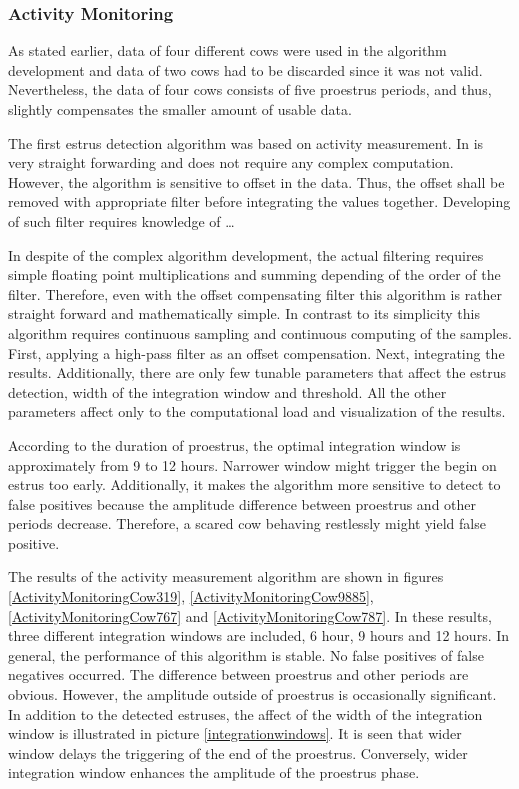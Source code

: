 \documentclass[english,12pt,a4paper,pdftex,elec,utf8]{aaltothesis}
\begin{document}
\subsubsection{Activity Monitoring} \label{activitymeasurementevaluation}






As stated earlier, data of four different cows were used in the algorithm development and data of two cows had to be discarded since it was not valid. Nevertheless, the data of four cows consists of five proestrus periods, and thus, slightly compensates the smaller amount of usable data.

The first estrus detection algorithm was based on activity measurement. In is very straight forwarding and does not require any complex computation. However, the algorithm is sensitive to offset in the data. Thus, the offset shall be removed with appropriate filter before integrating the values together. Developing of such filter requires knowledge of \dots

In despite of the complex algorithm development, the actual filtering requires simple floating point multiplications and summing depending of the order of the filter. Therefore, even with the offset compensating filter this algorithm is rather straight forward and mathematically simple. In contrast to its simplicity this algorithm requires continuous sampling and continuous computing of the samples. First, applying a high-pass filter as an offset compensation. Next, integrating the results. Additionally, there are only few tunable parameters that affect the estrus detection, width of the integration window and threshold. All the other parameters affect only to the computational load and visualization of the results.

According to the duration of proestrus, the optimal integration window is approximately from 9 to 12 hours. Narrower window might trigger the begin on estrus too early. Additionally, it makes the algorithm more sensitive to detect to false positives because the amplitude difference between proestrus and other periods decrease. Therefore, a scared cow behaving restlessly might yield false positive.

The results of the activity measurement algorithm are shown in figures \ref{ActivityMonitoringCow319}, \ref{ActivityMonitoringCow9885}, \ref{ActivityMonitoringCow767} and \ref{ActivityMonitoringCow787}. In these results, three different integration windows are included, 6 hour, 9 hours and 12 hours. In general, the performance of this algorithm is stable. No false positives of false negatives occurred. The difference between proestrus and other periods are obvious. However, the amplitude outside of proestrus is occasionally significant. In addition to the detected estruses, the affect of the width of the integration window is illustrated in picture \ref{integrationwindows}. It is seen that wider window delays the triggering of the end of the proestrus. Conversely, wider integration window enhances the amplitude of the proestrus phase. 
\end{document}
